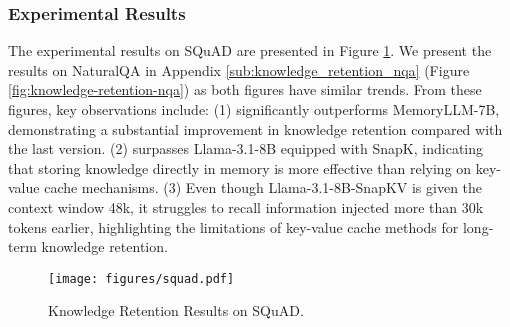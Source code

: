 \subsubsection{Experimental Results}
\vspace{-5pt}
The experimental results on SQuAD are presented in Figure  \ref{fig:knowledge-retention-squad}. We present the results on NaturalQA in Appendix \ref{sub:knowledge_retention_nqa} (Figure \ref{fig:knowledge-retention-nqa}) as both figures have similar trends. From these figures, key observations include: (1) \ours significantly outperforms MemoryLLM-7B, demonstrating a substantial improvement in knowledge retention compared with the last version. (2) \ours surpasses Llama-3.1-8B equipped with SnapK, indicating that storing knowledge directly in memory is more effective than relying on key-value cache mechanisms. (3) Even though Llama-3.1-8B-SnapKV is given the context window 48k, it struggles to recall information injected more than 30k tokens earlier, highlighting the limitations of key-value cache methods for long-term knowledge retention. 

\begin{figure}
    \centering
    \texttt{[image: figures/squad.pdf]}
    \vspace{-22pt}
    \caption{Knowledge Retention Results on SQuAD.}
    \label{fig:knowledge-retention-squad}
    \vspace{-15pt}
\end{figure}


\vspace{-3pt}
